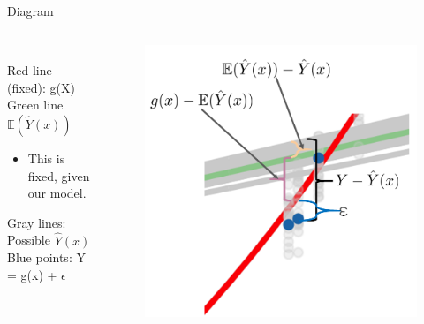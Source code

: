 \documentclass[aspectratio=169]{../latex_main/tntbeamer}  %
\begin{document}
	\begin{frame}[c]{Diagram}
	  \begin{columns}
	     
	      
	      \begin{column}{.4\textwidth}
	      \\
	      \bigskip
	      \bigskip
	      \bigskip
	          Red line (fixed): g(X)\\
	          Green line $\mathbb{E}(\hat{Y}(x))$
	          \begin{itemize}
	              \item This is fixed, given our model.
	          \end{itemize}
	          Gray lines: Possible $\hat{Y}(x)$\\
	          Blue points: Y = g(x) + $\epsilon$
	      \end{column}
	      
	      
	       \begin{column}{.6\textwidth}
	           \begin{figure}
	               \includegraphics[scale=.3]{Bild13}
	           \end{figure} 
	      \end{column}
	  \end{columns}
	\end{frame}
	
\end{document}
